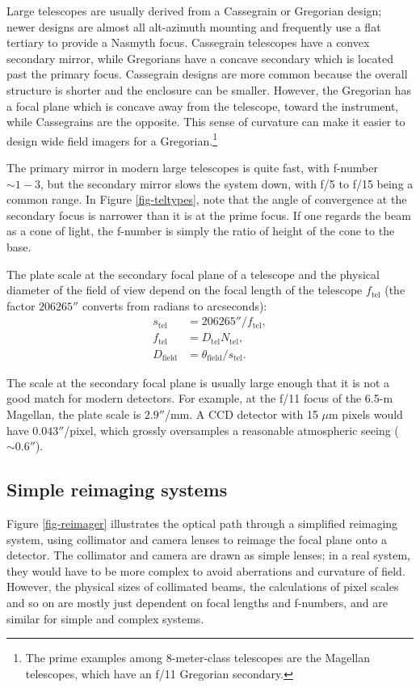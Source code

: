 \documentclass[12pt]{article}
\newcommand{\subscript}[1]{\mathrm{#1}}
\newcommand{\field}{\subscript{field}}
\newcommand{\tel}{\subscript{tel}}
\begin{document}
Large telescopes are usually derived from a Cassegrain or
Gregorian design; newer designs are almost all alt-azimuth 
mounting and frequently use a flat tertiary to provide a
Nasmyth focus.  Cassegrain telescopes have a convex secondary
mirror, while Gregorians have a concave secondary which is
located past the primary focus.  Cassegrain designs are more
common because the overall structure is shorter and the
enclosure can be smaller.  However, the Gregorian has a focal
plane which is concave away from the telescope, toward the
instrument, while Cassegrains are the opposite.  This sense
of curvature can make it easier to design wide field imagers
for a Gregorian.\footnote{The prime examples among 8-meter-class
telescopes are the Magellan telescopes, which have an f/11 Gregorian
secondary.}

The primary mirror in modern large telescopes is quite fast, with
f-number $\sim 1-3$, but the secondary mirror slows the system
down, with f/5 to f/15 being a common range.  In Figure
\ref{fig-teltypes}, note that the angle of convergence
at the secondary focus is narrower than it is at the prime
focus.  If one regards the beam as a cone of light, the f-number 
is simply the ratio of height of the cone to the base.

The plate scale at the secondary focal plane of a telescope and
the physical diameter of the field of view depend on the
focal length of the telescope $f_{\tel}$
(the factor $206265''$ converts from radians to arcseconds):
\begin{align*}
s_{\tel} &= 206265'' / f_{\tel}, \\
f_{\tel} &= D_{\tel} N_{\tel}, \\
D_{\field} &= \theta_{\field} / s_{\tel}.
\end{align*}

The scale at the secondary focal plane is usually large 
enough that it is not a good match for modern detectors.
For example, at the f/11 focus of the 6.5-m Magellan,
the plate scale is $2.9''$/mm.  A CCD detector with 15 $\mu$m pixels
would have $0.043''$/pixel, which grossly oversamples a
reasonable atmospheric seeing ($\sim 0.6''$).

\subsection{Simple reimaging systems}

Figure \ref{fig-reimager} illustrates the optical path
through a simplified reimaging system, using collimator 
and camera lenses to reimage the focal plane onto a detector.
The collimator and camera are drawn as simple lenses;
in a real system, they would have to be more complex
to avoid aberrations and curvature of field.  However,
the physical sizes of collimated beams,
the calculations of pixel scales and so on are mostly 
just dependent on focal lengths and f-numbers, and are
similar for simple and complex systems.
\end{document}
